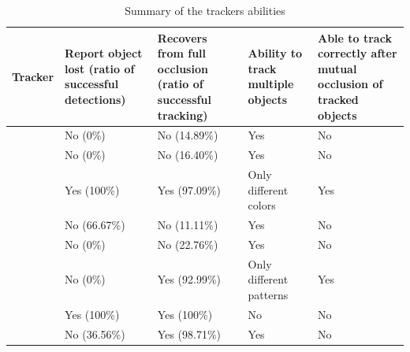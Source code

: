 \begin{landscape}
\begin{table}
\centering
\begin{tabular}{p{5cm}|p{3cm}|p{4cm}|p{5cm}|p{5cm}}
Tracker & Report object lost (ratio of successful detections) & Recovers from full occlusion (ratio of successful tracking)& Ability to track multiple objects & Able to track correctly after mutual occlusion of tracked objects \\
\hline
\boost{} & No (0\%)& No (14.89\%) & Yes & No \\
\corr{} & No (0\%)& No (16.40\%)& Yes & No \\
\hsv{} & Yes (100\%)& Yes (97.09\%) & Only different colors & Yes \\
\medflow{} & No (66.67\%)& No (11.11\%)& Yes & No \\
\mil{} & No (0\%) & No (22.76\%) & Yes & No \\
\patt{} & No (0\%) & Yes (92.99\%) & Only different patterns & Yes \\
\simback{} & Yes (100\%) & Yes (100\%) & No & No \\
\tld{} & No (36.56\%) & Yes (98.71\%) & Yes & No \\
\end{tabular}
\caption{Summary of the trackers abilities}
\label{table:occlusion-multiple}
\end{table}
\end{landscape}

